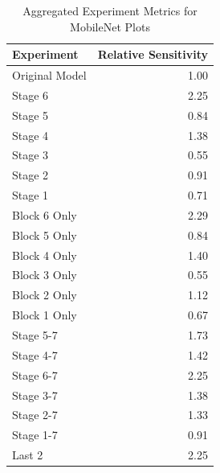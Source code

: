 \begin{table}
\caption{Aggregated Experiment Metrics for MobileNet Plots}
\label{tab:exp_plot_data_mobilenet}
\begin{tabular}{lr}
\toprule
Experiment & Relative Sensitivity \\
\midrule
Original Model & 1.00 \\
Stage 6 & 2.25 \\
Stage 5 & 0.84 \\
Stage 4 & 1.38 \\
Stage 3 & 0.55 \\
Stage 2 & 0.91 \\
Stage 1 & 0.71 \\
Block 6 Only & 2.29 \\
Block 5 Only & 0.84 \\
Block 4 Only & 1.40 \\
Block 3 Only & 0.55 \\
Block 2 Only & 1.12 \\
Block 1 Only & 0.67 \\
Stage 5-7 & 1.73 \\
Stage 4-7 & 1.42 \\
Stage 6-7 & 2.25 \\
Stage 3-7 & 1.38 \\
Stage 2-7 & 1.33 \\
Stage 1-7 & 0.91 \\
Last 2 & 2.25 \\
\bottomrule
\end{tabular}
\end{table}
